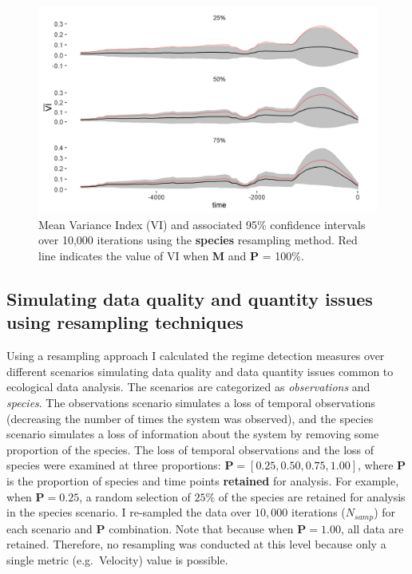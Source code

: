\documentclass[print]{nuthesis}
\begin{document}
\begin{figure}
\includegraphics[width=0.85\linewidth]{./chapterFiles/resampling/figsCalledInDiss/VI_species_ribboned_facetByProb} \caption{Mean Variance Index (VI) and associated 95\% confidence intervals over 10,000 iterations using the \textbf{species} resampling method. Red line indicates the value of VI when \textbf{M} and \textbf{P} = 100\%.}\label{fig:viResamp2}
\end{figure}
\hypertarget{simulating-data-quality-and-quantity-issues-using-resampling-techniques}{%
\subsection{Simulating data quality and quantity issues using resampling techniques}\label{simulating-data-quality-and-quantity-issues-using-resampling-techniques}}

Using a resampling approach I calculated the regime detection measures over different scenarios simulating data quality and data quantity issues common to ecological data analysis. The scenarios are categorized as \emph{observations} and \emph{species}. The observations scenario simulates a loss of temporal observations (decreasing the number of times the system was observed), and the species scenario simulates a loss of information about the system by removing some proportion of the species. The loss of temporal observations and the loss of species were examined at three proportions: \(\textbf{P} = [0.25, 0.50, 0.75, 1.00]\), where \(\textbf{P}\) is the proportion of species and time points \textbf{retained} for analysis. For example, when \(\textbf{P} = 0.25\), a random selection of \(25\%\) of the species are retained for analysis in the species scenario. I re-sampled the data over \(10,000\) iterations (\(N_{samp}\)) for each scenario and \(\textbf{P}\) combination. Note that because when \(\textbf{P} = 1.00\), all data are retained. Therefore, no resampling was conducted at this level because only a single metric (e.g.~Velocity) value is possible.
\end{document}
